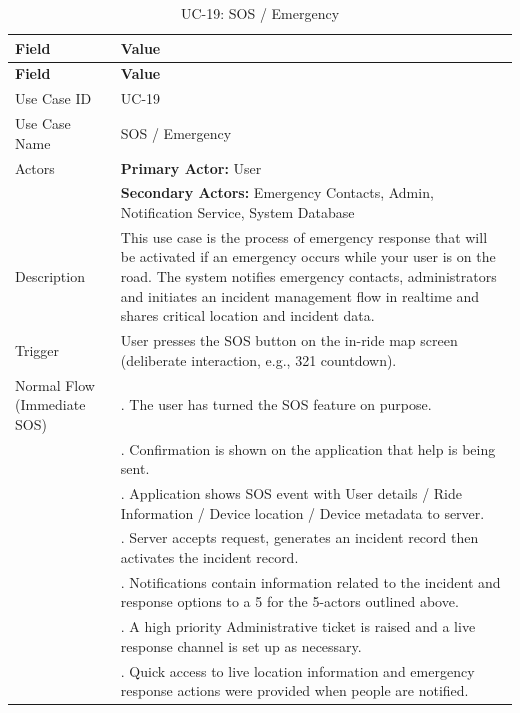 \begin{longtable}{|>{\raggedright\arraybackslash}p{4cm}|>{\raggedright\arraybackslash}p{11cm}|}
\caption{UC-19: SOS / Emergency}
\label{tab:uc-19} \\
\hline
\rowcolor{lightgray!30}
\textbf{Field} & \textbf{Value} \\
\hline
\endfirsthead
\hline
\rowcolor{lightgray!30}
\textbf{Field} & \textbf{Value} \\
\hline
\endhead
\hline
\endfoot
\hline
\endlastfoot
Use Case ID & UC-19 \\
\hline
Use Case Name & SOS / Emergency \\
\hline
Actors & \textbf{Primary Actor:} User \\
& \textbf{Secondary Actors:} Emergency Contacts, Admin, Notification Service, System Database \\
\hline
Description & This use case is the process of emergency response that will be activated if an emergency occurs while your user is on the road. The system notifies emergency contacts, administrators and initiates an incident management flow in realtime and shares critical location and incident data. \\
\hline
Trigger & User presses the SOS button on the in-ride map screen (deliberate interaction, e.g., 321 countdown). \\
\hline
Normal Flow (Immediate SOS) & 1. The user has turned the SOS feature on purpose. \\
& 2. Confirmation is shown on the application that help is being sent. \\
& 3. Application shows SOS event with User details / Ride Information / Device location / Device metadata to server. \\
& 4. Server accepts request, generates an incident record then activates the incident record. \\
& 5. Notifications contain information related to the incident and response options to a 5 for the 5-actors outlined above. \\
& 6. A high priority Administrative ticket is raised and a live response channel is set up as necessary. \\
& 7. Quick access to live location information and emergency response actions were provided when people are notified. \\

\end{longtable}
